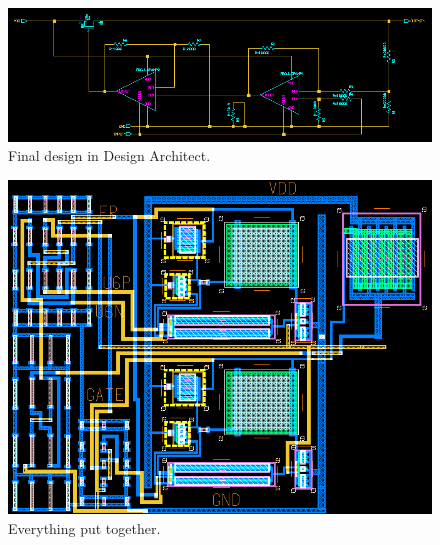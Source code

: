 \documentclass[10pt]{amsart}
\begin{document}
\begin{figure}[H]
	\begin{center}
		\includegraphics[width=5in]{Media/schem.png}
	\end{center}
	\caption{Final design in Design Architect.}
	\label{fig:cc}
\end{figure}

\begin{figure}[H]
	\begin{center}
		\includegraphics[width=8in, angle=90]{Media/lay_final.png}
	\end{center}
	\caption{Everything put together.}
	\label{fig:cc}
\end{figure}
\end{document}
